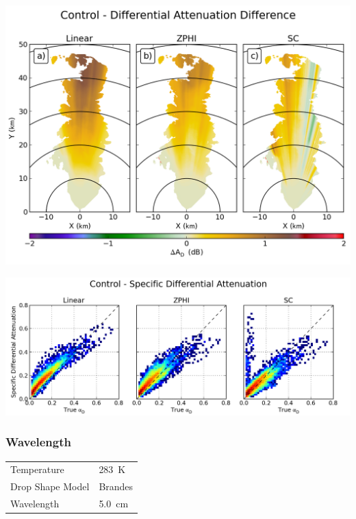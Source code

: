 \documentclass[red]{beamer}
\begin{document}
\begin{frame}
	\begin{center}
		\includegraphics[scale=0.45]{figures/C_Control_Differential_Attenuation_Difference.png}
	\end{center}
\end{frame}

\begin{frame}
	\begin{center}
		\includegraphics[scale=0.45]{figures/C_Control_Specific_Differential_Attenuation_scatter.png}
	\end{center}
\end{frame}

\begin{frame}
	\frametitle{Wavelength}
	\begin{center}
	    \begin{tabular}{ | l | l | }
	        \hline
	        Temperature & \SI{283}{\kelvin} \\
	        Drop Shape Model & Brandes \\
	        Wavelength & \SI{5.0}{\centi\meter} \\
			\hline
	    \end{tabular}
	\end{center}	
\end{frame}
\end{document}
